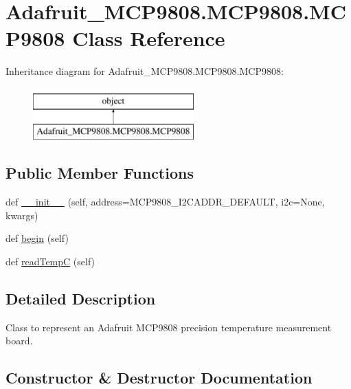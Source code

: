 \hypertarget{classAdafruit__MCP9808_1_1MCP9808_1_1MCP9808}{}\section{Adafruit\+\_\+\+M\+C\+P9808.\+M\+C\+P9808.\+M\+C\+P9808 Class Reference}
\label{classAdafruit__MCP9808_1_1MCP9808_1_1MCP9808}
Inheritance diagram for Adafruit\+\_\+\+M\+C\+P9808.\+M\+C\+P9808.\+M\+C\+P9808\+:\begin{figure}[H]
\begin{center}
\leavevmode
\includegraphics[height=2.000000cm]{classAdafruit__MCP9808_1_1MCP9808_1_1MCP9808}
\end{center}
\end{figure}
\subsection*{Public Member Functions}
\begin{DoxyCompactItemize}
\item 
def \hyperlink{classAdafruit__MCP9808_1_1MCP9808_1_1MCP9808_a6c7c1f671a5a3224bb7e081ea5811d06}{\+\_\+\+\_\+init\+\_\+\+\_\+} (self, address=M\+C\+P9808\+\_\+\+I2\+C\+A\+D\+D\+R\+\_\+\+D\+E\+F\+A\+U\+LT, i2c=None, kwargs)
\item 
def \hyperlink{classAdafruit__MCP9808_1_1MCP9808_1_1MCP9808_ab62a703ef4cf09887846d3eeaa401772}{begin} (self)
\item 
def \hyperlink{classAdafruit__MCP9808_1_1MCP9808_1_1MCP9808_a0920c36ee50223d2fda4f6e7caadcada}{read\+TempC} (self)
\end{DoxyCompactItemize}


\subsection{Detailed Description}
\begin{DoxyVerb}Class to represent an Adafruit MCP9808 precision temperature measurement
board.
\end{DoxyVerb}
 

\subsection{Constructor \& Destructor Documentation}
\mbox{\label{classAdafruit__MCP9808_1_1MCP9808_1_1MCP9808_a6c7c1f671a5a3224bb7e081ea5811d06}} 
